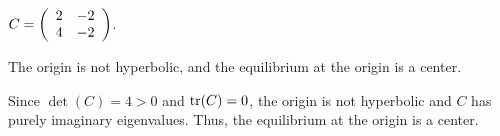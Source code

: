 \documentclass{ximera}
\begin{document}
\begin{exercise}  \label{E:PQe}
$C = \left(\begin{array}{rr} 2 & -2\\ 4 &-2\end{array}\right)$.

\begin{solution}
\ans The origin is not hyperbolic, and the equilibrium at
the origin is a center.

\soln Since $\det(C) = 4 > 0$ and ${\rm tr}(C) = 0$, the origin is not
hyperbolic and $C$ has purely imaginary eigenvalues.  Thus, the
equilibrium at the origin is a center.

\end{solution}
\end{exercise}
\end{document}
